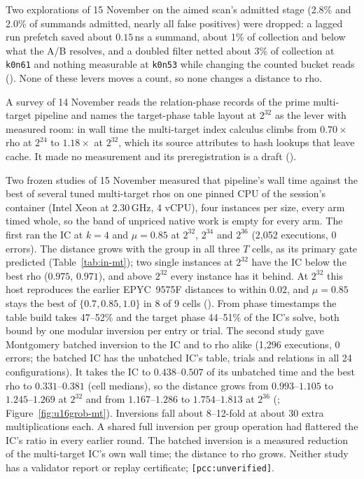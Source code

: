 \noindent Two explorations of 15 November on the aimed scan's admitted
stage (2.8\% and 2.0\% of summands admitted, nearly all false positives) were
dropped: a lagged run prefetch saved about $0.15$\,ns a summand, about 1\% of
collection and below what the A/B resolves, and a doubled filter netted
about 3\% of collection at \texttt{k0n61} and nothing measurable at
\texttt{k0n53} while changing the counted bucket reads
().
None of these levers moves a count, so none changes a distance to rho.

A survey of 14 November reads the relation-phase records of the prime
multi-target pipeline and names the target-phase table layout at
$2^{32}$ as the lever with measured room: in wall time the multi-target
index calculus climbs from $0.70\times$ rho at $2^{24}$ to $1.18\times$ at
$2^{32}$, which its source attributes to hash lookups that leave cache. It
made no measurement and its preregistration is a draft
().

Two frozen studies of 15 November measured that pipeline's wall time
against the best of several tuned multi-target rhos on one pinned CPU of
the session's container (Intel Xeon at 2.30\,GHz, 4 vCPU), four instances
per size, every arm timed whole, so the band of unpriced native work is
empty for every arm. The first ran the IC at $k=4$ and $\mu=0.85$ at
$2^{32}$, $2^{34}$ and $2^{36}$ (2{,}052 executions, 0 errors). The
distance grows with the group in all three $T$ cells, as its primary gate
predicted (Table~\ref{tab:in-mt}); two single instances at $2^{32}$ have the
IC below the best rho ($0.975$, $0.971$), and above $2^{32}$ every instance
has it behind. At $2^{32}$ this host reproduces the earlier EPYC~9575F
distances to within $0.02$, and $\mu=0.85$ stays the best of
$\{0.7,0.85,1.0\}$ in 8 of 9 cells
(). From phase timestamps
the table build takes 47--52\% and the target phase 44--51\% of the IC's
solve, both bound by one modular inversion per entry or trial. The second
study gave Montgomery batched inversion to the IC and to rho alike
(1{,}296 executions, 0 errors; the batched IC has the unbatched IC's
table, trials and relations in all 24 configurations). It takes the IC to
$0.438$--$0.507$ of its unbatched time and the best rho to $0.331$--$0.381$
(cell medians), so the distance grows from $0.993$--$1.105$ to
$1.245$--$1.269$ at $2^{32}$ and from $1.167$--$1.286$ to $1.754$--$1.813$
at $2^{36}$ (;
Figure~\ref{fig:u16grob-mt}). Inversions fall about 8--12-fold at about 30
extra multiplications each. A shared full inversion per group operation
had flattered the IC's ratio in every earlier round. The batched
inversion is a measured reduction of the multi-target IC's own wall
time; the distance to rho grows. Neither study has a validator report or
replay certificate; \texttt{[pcc:unverified]}.

